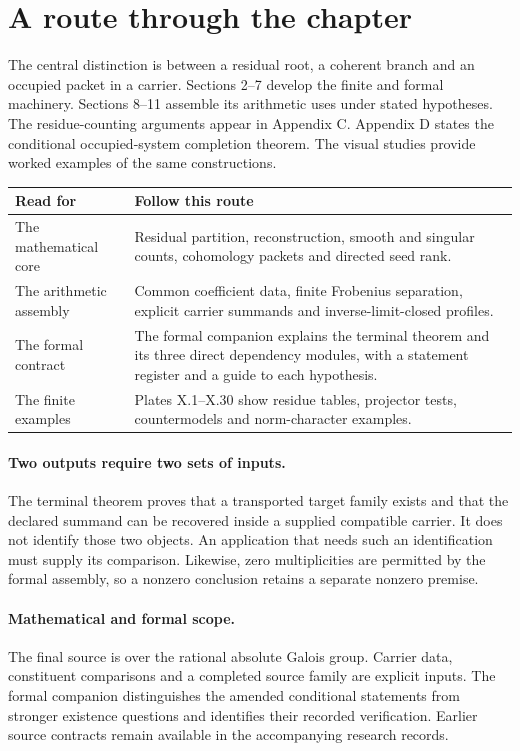 \section*{A route through the chapter}
The central distinction is between a residual root, a coherent branch and an
occupied packet in a carrier. Sections 2--7 develop the finite and formal
machinery. Sections 8--11 assemble its arithmetic uses under stated hypotheses.
The residue-counting arguments appear in Appendix C. Appendix D states the
conditional occupied-system completion theorem. The visual studies provide
worked examples of the same constructions.

\begin{tabularx}{\linewidth}{@{}p{.24\linewidth}X@{}}\toprule
Read for & Follow this route\\\midrule
The mathematical core & Residual partition, reconstruction, smooth and singular counts, cohomology packets and directed seed rank.\\
The arithmetic assembly & Common coefficient data, finite Frobenius separation, explicit carrier summands and inverse-limit-closed profiles.\\
The formal contract & The formal companion explains the terminal theorem and its three direct dependency modules, with a statement register and a guide to each hypothesis.\\
The finite examples & Plates X.1--X.30 show residue tables, projector tests, countermodels and norm-character examples.\\\bottomrule
\end{tabularx}

\paragraph{Two outputs require two sets of inputs.}
The terminal theorem proves that a transported target family exists and that the
declared summand can be recovered inside a supplied compatible carrier. It does
not identify those two objects. An application that needs such an identification
must supply its comparison. Likewise, zero multiplicities are permitted by the
formal assembly, so a nonzero conclusion retains a separate nonzero premise.

\paragraph{Mathematical and formal scope.}
The final source is over the rational absolute Galois group. Carrier data,
constituent comparisons and a completed source family are explicit inputs.
The formal companion distinguishes the amended conditional statements from
stronger existence questions and identifies their recorded verification.
Earlier source contracts remain available in the accompanying research records.
